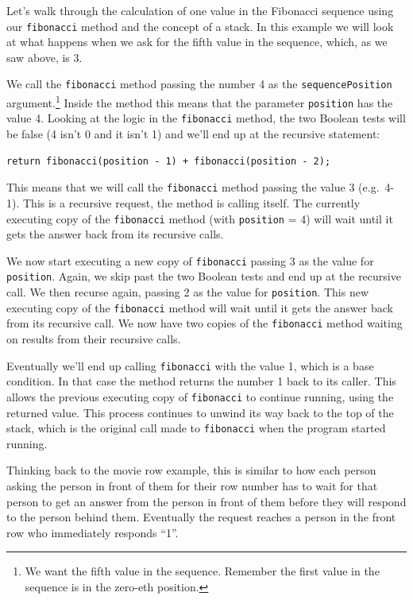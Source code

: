 Let's walk through the calculation of one value in the Fibonacci sequence using our \texttt{fibonacci} method and the concept of a stack. In this example we will look at what happens when we ask for the fifth value in the sequence, which, as we saw above, is 3.

We call the \texttt{fibonacci} method passing the number 4 as the \texttt{sequencePosition} argument.\footnote{We want the fifth value in the sequence. Remember the first value in the sequence is in the zero-eth position.} Inside the method this means that the parameter \texttt{position} has the value 4. Looking at the logic in the \texttt{fibonacci} method, the two Boolean tests will be false (4 isn't 0 and it isn't 1) and we'll end up at the recursive statement:

\beforeverb
\begin{verbatim}
return fibonacci(position - 1) + fibonacci(position - 2);
\end{verbatim}
\afterverb

This means that we will call the \texttt{fibonacci} method passing the value 3 \mbox{(e.g. 4-1)}. This is a recursive request, the method is calling itself. The currently executing copy of the \texttt{fibonacci} method (with \texttt{position} = 4) will wait until it gets the answer back from its recursive calls.

We now start executing a new copy of \texttt{fibonacci} passing 3 as the value for \texttt{position}. Again, we skip past the two Boolean tests and end up at the recursive call. We then recurse again, passing 2 as the value for \texttt{position}. This new executing copy of the \texttt{fibonacci} method will wait until it gets the answer back from its recursive call. We now have two copies of the \texttt{fibonacci} method waiting on results from their recursive calls.

Eventually we'll end up calling \texttt{fibonacci} with the value 1, which is a base condition. In that case the method returns the number 1 back to its caller. This allows the previous executing copy of \texttt{fibonacci} to continue running, using the returned value. This process continues to unwind its way back to the top of the stack, which is the original call made to \texttt{fibonacci} when the program started running.

Thinking back to the movie row example, this is similar to how each person asking the person in front of them for their row number has to wait for that person to get an answer from the person in front of them before they will respond to the person behind them. Eventually the request reaches a person in the front row who immediately responds ``1''.

